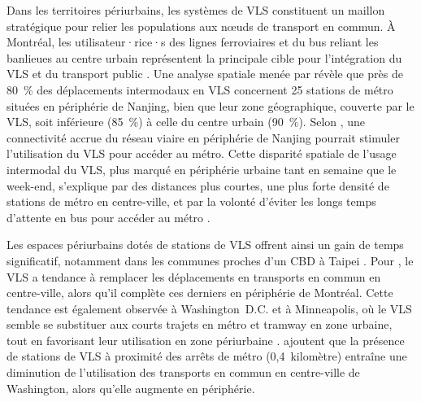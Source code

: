 \begin{refsegment}
Dans les territoires périurbains, les systèmes de \acrshort{VLS} constituent un maillon stratégique pour relier les populations aux nœuds de transport en commun. À Montréal, les utilisateur·rice·s des lignes ferroviaires et du bus reliant les banlieues au centre urbain représentent la principale cible pour l'intégration du \acrshort{VLS} et du transport public \textcolor{blue}{\autocite[116]{bachand-marleau_much-anticipated_2011}}. Une analyse spatiale menée par \textcolor{blue}{\textcite[9]{ma_measuring_2018}} révèle que près de 80~\% des déplacements intermodaux en \acrshort{VLS} concernent 25 stations de métro situées en périphérie de Nanjing, bien que leur zone géographique, couverte par le \acrshort{VLS}, soit inférieure (85~\%) à celle du centre urbain (90~\%). Selon \textcolor{blue}{\textcite[17]{ji_exploring_2018}}, une connectivité accrue du réseau viaire en périphérie de Nanjing pourrait stimuler l'utilisation du \acrshort{VLS} pour accéder au métro. Cette disparité spatiale de l'usage intermodal du \acrshort{VLS}, plus marqué en périphérie urbaine tant en semaine que le week-end, s'explique par des distances plus courtes, une plus forte densité de stations de métro en centre-ville, et par la volonté d'éviter les longs temps d'attente en bus pour accéder au métro \textcolor{blue}{\autocite[67]{ma_understanding_2018}}.%

Les espaces périurbains dotés de stations de \acrshort{VLS} offrent ainsi un gain de temps significatif, notamment dans les communes proches d'un \acrshort{CBD} à Taipei \textcolor{blue}{\autocite[11]{yen_how_2023}}. Pour \textcolor{blue}{\textcite[478, 482]{tarpin-pitre_typology_2020}}, le \acrshort{VLS} a tendance à remplacer les déplacements en transports en commun en centre-ville, alors qu'il complète ces derniers en périphérie de Montréal. Cette tendance est également observée à Washington~D.C. et à Minneapolis, où le \acrshort{VLS} semble se substituer aux courts trajets en métro et tramway en zone urbaine, tout en favorisant leur utilisation en zone périurbaine \textcolor{blue}{\autocite[320-321]{martin_evaluating_2014}}. \textcolor{blue}{\textcite[376]{ma_estimating_2019}} ajoutent que la présence de stations de \acrshort{VLS} à proximité des arrêts de métro (0,4~kilomètre) entraîne une diminution de l'utilisation des transports en commun en centre-ville de Washington, alors qu'elle augmente en périphérie.%


\end{refsegment}
